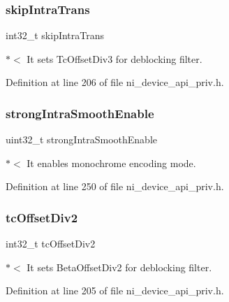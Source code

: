 \mbox{\label{struct__ni__t408__config__t_aebe9b535ea2f741db2c160ccd68061bf}} 
\subsubsection{\texorpdfstring{skipIntraTrans}{skipIntraTrans}}
{\footnotesize\ttfamily int32\+\_\+t skip\+Intra\+Trans}

$\ast$$<$ It sets Tc\+Offset\+Div3 for deblocking filter. 

Definition at line 206 of file ni\+\_\+device\+\_\+api\+\_\+priv.\+h.

\mbox{\label{struct__ni__t408__config__t_a1323fab1abae8075404e760bd25c2e2d}} 
\subsubsection{\texorpdfstring{strongIntraSmoothEnable}{strongIntraSmoothEnable}}
{\footnotesize\ttfamily uint32\+\_\+t strong\+Intra\+Smooth\+Enable}

$\ast$$<$ It enables monochrome encoding mode. 

Definition at line 250 of file ni\+\_\+device\+\_\+api\+\_\+priv.\+h.

\mbox{\label{struct__ni__t408__config__t_a5f2f5aa936c6d5e154457c67a8686b11}} 
\subsubsection{\texorpdfstring{tcOffsetDiv2}{tcOffsetDiv2}}
{\footnotesize\ttfamily int32\+\_\+t tc\+Offset\+Div2}

$\ast$$<$ It sets Beta\+Offset\+Div2 for deblocking filter. 

Definition at line 205 of file ni\+\_\+device\+\_\+api\+\_\+priv.\+h.

